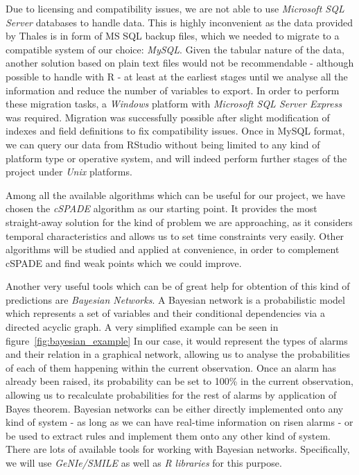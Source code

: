 Due to licensing and compatibility issues, we are not able to use \emph{Microsoft SQL Server} databases to handle data. This is highly inconvenient as the data provided by Thales is in form of MS SQL backup files, which we needed to migrate to a compatible system of our choice: \emph{MySQL}. Given the tabular nature of the data, another solution based on plain text files would not be recommendable - although possible to handle with R - at least at the earliest stages until we analyse all the information and reduce the number of variables to export. In order to perform these migration tasks, a \emph{Windows} platform with \emph{Microsoft SQL Server Express} was required. Migration was successfully possible after slight modification of indexes and field definitions to fix compatibility issues. Once in MySQL format, we can query our data from RStudio without being limited to any kind of platform type or operative system, and will indeed perform further stages of the project under \emph{Unix} platforms.

Among all the available algorithms which can be useful for our project, we have chosen the \emph{cSPADE} algorithm\cite{zaki2001spade} as our starting point. It provides the most straight-away solution for the kind of problem we are approaching, as it considers temporal characteristics and allows us to set time constraints very easily. Other algorithms will be studied and applied at convenience, in order to complement cSPADE and find weak points which we could improve.

Another very useful tools which can be of great help for obtention of this kind of predictions are \emph{Bayesian Networks}\cite{jensen1996introduction}. A Bayesian network is a probabilistic model which represents a set of variables and their conditional dependencies via a directed acyclic graph. A very simplified example can be seen in figure~\ref{fig:bayesian_example} In our case, it would represent the types of alarms and their relation in a graphical network, allowing us to analyse the probabilities of each of them happening within the current observation. Once an alarm has already been raised, its probability can be set to 100\% in the current observation, allowing us to recalculate probabilities for the rest of alarms by application of Bayes theorem. Bayesian networks can be either directly implemented onto any kind of system - as long as we can have real-time information on risen alarms - or be used to extract rules and implement them onto any other kind of system. There are lots of available tools for working with Bayesian networks. Specifically, we will use \emph{GeNIe/SMILE}\cite{druzdzel1999smile} as well as \emph{R libraries} for this purpose.

